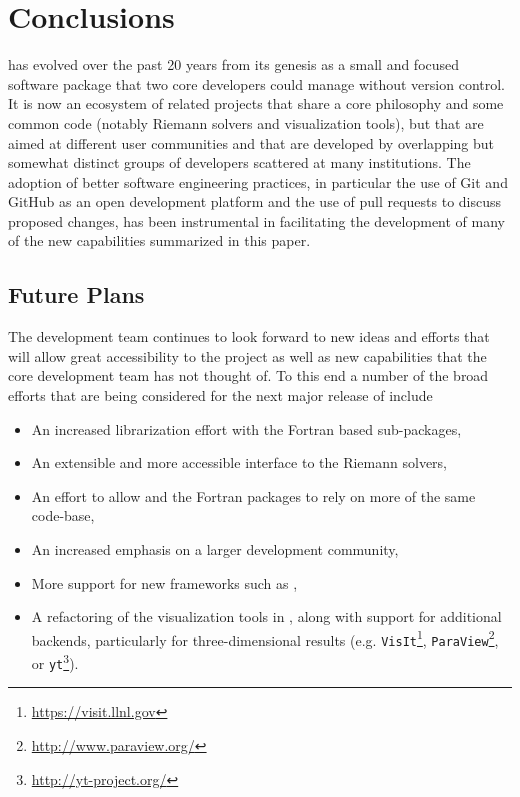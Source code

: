 %
%
%

\section{Conclusions} \label{sec:conclusions}

\clawpack has evolved over the past 20 years from its genesis as a small and
focused software package that two core developers could manage without
version control.  It is now an ecosystem of related projects that share a core
philosophy and some common code (notably Riemann solvers and visualization
tools), but that are aimed at different user
communities and that are developed by overlapping but somewhat distinct
groups of developers scattered at many institutions.  The adoption of better
software engineering practices, in particular the use of Git and GitHub as an
open development platform and the use of pull requests to discuss proposed
changes, has been instrumental in facilitating the development of many of the
new capabilities summarized in this paper.  

\subsection{Future Plans} \label{sub:future}

The \clawpack development team continues to look forward to new ideas and
efforts that will allow great accessibility to the project as well as new
capabilities that the core development team has not thought of.  To this end a
number of the broad efforts that are being considered for the next major release
of \clawpack include
\begin{itemize}
    \item An increased librarization effort with the Fortran based sub-packages,
    \item An extensible and more accessible interface to the Riemann solvers,
    \item An effort to allow \pyclaw and the \clawpack Fortran packages to rely
    on more of the same code-base,
    \item An increased emphasis on a larger development community,
    \item More support for new frameworks such as \forestclaw \cite{Burstedde:we},
    \item A refactoring of the visualization tools in \visclaw, along with
    support for additional backends, particularly for three-dimensional results
    (e.g.
\texttt{VisIt}\footnote{\url{https://visit.llnl.gov}}, 
\texttt{ParaView}\footnote{\url{http://www.paraview.org/}}, or 
\texttt{yt}\footnote{\url{http://yt-project.org/}}).
\end{itemize}
